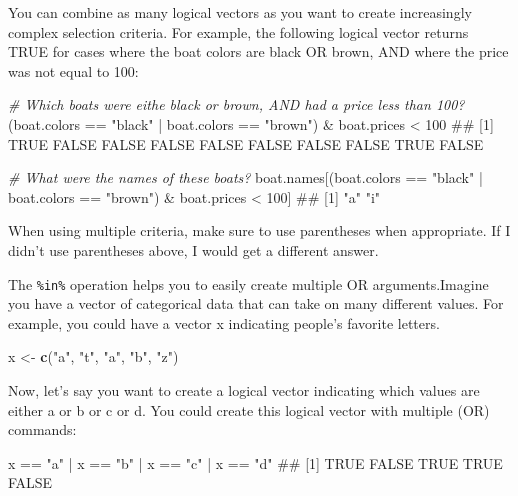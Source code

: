 \documentclass[]{book}
\newenvironment{Shaded}{\begin{snugshade}}{\end{snugshade}}
\newcommand{\KeywordTok}[1]{\textcolor[rgb]{0.13,0.29,0.53}{\textbf{{#1}}}}
\newcommand{\DecValTok}[1]{\textcolor[rgb]{0.00,0.00,0.81}{{#1}}}
\newcommand{\StringTok}[1]{\textcolor[rgb]{0.31,0.60,0.02}{{#1}}}
\newcommand{\CommentTok}[1]{\textcolor[rgb]{0.56,0.35,0.01}{\textit{{#1}}}}
\newcommand{\NormalTok}[1]{{#1}}
\theoremstyle{definition}
\theoremstyle{definition}
\theoremstyle{remark}
\begin{document}
You can combine as many logical vectors as you want to create
increasingly complex selection criteria. For example, the following
logical vector returns TRUE for cases where the boat colors are black OR
brown, AND where the price was not equal to 100:

\begin{Shaded}
\begin{Highlighting}[]
\CommentTok{# Which boats were eithe black or brown, AND had a price less than 100?}
\NormalTok{(boat.colors ==}\StringTok{ "black"} \NormalTok{|}\StringTok{ }\NormalTok{boat.colors ==}\StringTok{ "brown"}\NormalTok{) &}\StringTok{ }\NormalTok{boat.prices <}\StringTok{ }\DecValTok{100}
\NormalTok{##  [1]  TRUE FALSE FALSE FALSE FALSE FALSE FALSE FALSE  TRUE FALSE}

\CommentTok{# What were the names of these boats?}
\NormalTok{boat.names[(boat.colors ==}\StringTok{ "black"} \NormalTok{|}\StringTok{ }\NormalTok{boat.colors ==}\StringTok{ "brown"}\NormalTok{) &}\StringTok{ }\NormalTok{boat.prices <}\StringTok{ }\DecValTok{100}\NormalTok{]}
\NormalTok{## [1] "a" "i"}
\end{Highlighting}
\end{Shaded}

When using multiple criteria, make sure to use parentheses when
appropriate. If I didn't use parentheses above, I would get a different
answer.

The \texttt{\%in\%} operation helps you to easily create multiple OR
arguments.Imagine you have a vector of categorical data that can take on
many different values. For example, you could have a vector x indicating
people's favorite letters.

\begin{Shaded}
\begin{Highlighting}[]
\NormalTok{x <-}\StringTok{ }\KeywordTok{c}\NormalTok{(}\StringTok{"a"}\NormalTok{, }\StringTok{"t"}\NormalTok{, }\StringTok{"a"}\NormalTok{, }\StringTok{"b"}\NormalTok{, }\StringTok{"z"}\NormalTok{)}
\end{Highlighting}
\end{Shaded}

Now, let's say you want to create a logical vector indicating which
values are either a or b or c or d. You could create this logical vector
with multiple \textbar{} (OR) commands:

\begin{Shaded}
\begin{Highlighting}[]
\NormalTok{x ==}\StringTok{ "a"} \NormalTok{|}\StringTok{ }\NormalTok{x ==}\StringTok{ "b"} \NormalTok{|}\StringTok{ }\NormalTok{x ==}\StringTok{ "c"} \NormalTok{|}\StringTok{ }\NormalTok{x ==}\StringTok{ "d"}
\NormalTok{## [1]  TRUE FALSE  TRUE  TRUE FALSE}
\end{Highlighting}
\end{Shaded}
\end{document}
